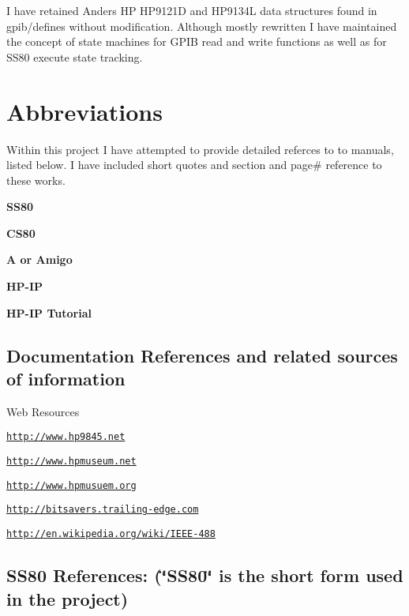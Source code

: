 I have retained Anders H\-P H\-P9121\-D and H\-P9134\-L data structures found in gpib/defines without modification. Although mostly rewritten I have maintained the concept of state machines for G\-P\-I\-B read and write functions as well as for S\-S80 execute state tracking.



 \section*{Abbreviations}

Within this project I have attempted to provide detailed referces to to manuals, listed below. I have included short quotes and section and page\# reference to these works.
\begin{DoxyItemize}
\item {\bfseries S\-S80}
\item {\bfseries C\-S80}
\item {\bfseries A or Amigo}
\item {\bfseries H\-P-\/\-I\-P}
\item {\bfseries H\-P-\/\-I\-P Tutorial}
\end{DoxyItemize}

\subsection*{Documentation References and related sources of information}


\begin{DoxyItemize}
\item Web Resources
\begin{DoxyItemize}
\item \href{http://www.hp9845.net}{\tt http\-://www.\-hp9845.\-net}
\item \href{http://www.hpmuseum.net}{\tt http\-://www.\-hpmuseum.\-net}
\item \href{http://www.hpmusuem.org}{\tt http\-://www.\-hpmusuem.\-org}
\item \href{http://bitsavers.trailing-edge.com}{\tt http\-://bitsavers.\-trailing-\/edge.\-com}
\item \href{http://en.wikipedia.org/wiki/IEEE-488}{\tt http\-://en.\-wikipedia.\-org/wiki/\-I\-E\-E\-E-\/488}
\end{DoxyItemize}
\end{DoxyItemize}

\subsection*{S\-S80 References\-: (\char`\"{}\-S\-S80\char`\"{} is the short form used in the project)}


